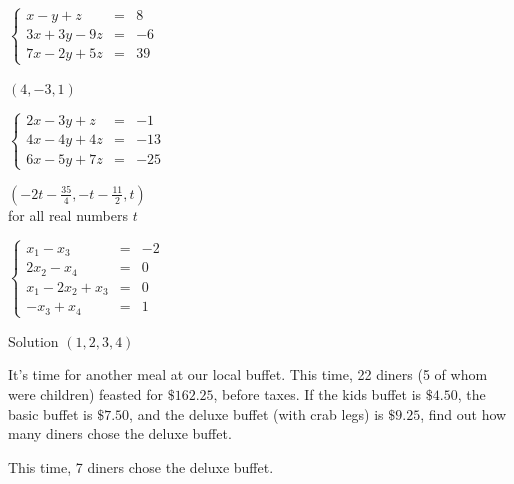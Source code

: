 \documentclass{ximera}
\begin{document}
\begin{question}
\begin{problem}
$\left\{ \begin{array}{rcr} x-y+z & = & 8 \\ 3x+3y-9z & = & -6 \\  7x-2y+5z & = & 39 \end{array} \right.$

\begin{solution}
$\left(4,-3,1\right)$
\end{solution}
\end{problem}

\begin{problem}
$\left\{ \begin{array}{rcr} 2x-3y+z & = & -1 \\ 4x-4y+4z & = & -13 \\ 6x-5y+7z & = & -25  \end{array} \right.$

\begin{solution}
$\left(-2t - \frac{35}{4},-t - \frac{11}{2},t\right)$\\
for all real numbers $t$
\end{solution}
\end{problem}

\begin{problem}\label{solveauglast}
$\left\{ \begin{array}{rcr} x_1 - x_3 & = & -2 \\ 
2x_2 - x_4 & = & 0  \\  
x_1 -  2x_2 + x_3 & = & 0 \\
-x_3 + x_4 & = & 1  \end{array} \right.$

\begin{solution}
Solution $(1, 2, 3, 4)$
\end{solution}
\end{problem}

\end{question}

\begin{problem}
It's time for another meal at our local buffet.  This time, 22 diners (5 of whom were children) feasted for $\$162.25$, before taxes.  If the kids buffet is $\$4.50$, the basic buffet is $\$7.50$, and the deluxe buffet (with crab legs) is $\$9.25$, find out how many diners chose the deluxe buffet.

\begin{solution}
This time, 7 diners chose the deluxe buffet.
\end{solution}
\end{problem}
\end{document}
